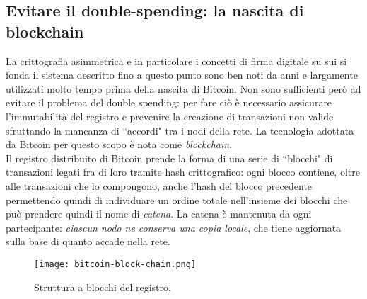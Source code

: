 	\subsection{Evitare il double-spending: la nascita di blockchain}
		La crittografia asimmetrica e in particolare i concetti di firma digitale su sui si fonda il sistema descritto fino a questo punto sono ben noti da anni e largamente utilizzati molto tempo prima della nascita di Bitcoin. Non sono sufficienti però ad evitare il problema del double spending: per fare ciò è necessario assicurare l'immutabilità del registro e prevenire la creazione di transazioni non valide sfruttando la mancanza di ``accordi" tra i nodi della rete. La tecnologia adottata da Bitcoin per questo scopo è nota come \emph{blockchain}. \\
		Il registro distribuito di Bitcoin prende la forma di una serie di ``blocchi" di transazioni legati fra di loro tramite hash crittografico: ogni blocco contiene, oltre alle transazioni che lo compongono, anche l'hash del blocco precedente permettendo quindi di individuare un ordine totale nell'insieme dei blocchi che può prendere quindi il nome di \emph{catena}. La catena è mantenuta da ogni partecipante: \emph{ciascun nodo ne conserva una copia locale}, che tiene aggiornata sulla base di quanto accade nella rete.
		\begin{figure}[ht]
			\centering
			\texttt{[image: bitcoin-block-chain.png]}
			\caption[Struttura a blocchi del registro]{Struttura a blocchi del registro.}
			\label{fig:bitcoin_chain}
		\end{figure}

